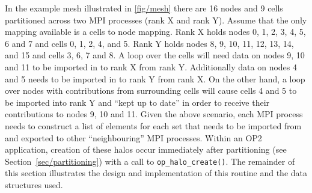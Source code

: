\documentclass[11pt]{article}
\begin{document}
\noindent In the example mesh illustrated in \figurename{ \ref{fig/mesh}} there
are 16 nodes and 9 cells partitioned across two MPI processes (rank X and rank
Y). Assume that the only mapping available is a cells to node mapping. Rank X
holds nodes 0, 1, 2, 3, 4, 5, 6 and 7 and cells 0, 1, 2, 4, and 5. Rank Y holds
nodes 8, 9, 10, 11, 12, 13, 14,  and 15 and cells 3, 6, 7 and 8. A loop over the
cells will need data on nodes 9, 10 and 11 to be imported in to rank X from
rank Y. Additionally data on nodes 4 and 5 needs to be imported in to rank Y
from rank X. On the other hand, a loop over nodes with contributions from
surrounding cells will cause cells 4 and 5 to be imported into rank Y and ``kept
up to date'' in order to receive their contributions to nodes 9, 10 and 11.
Given the above scenario, each MPI process needs to construct a list of elements
for each set that needs to be imported from and exported to other
``neighbouring'' MPI processes. Within an OP2 application, creation of these
halos occur immediately after partitioning (see Section~\ref{sec/partitioning}) with a call to
\texttt{op\_halo\_create()}. The remainder of this section illustrates the
design and implementation of this routine and the data structures used.
\end{document}
